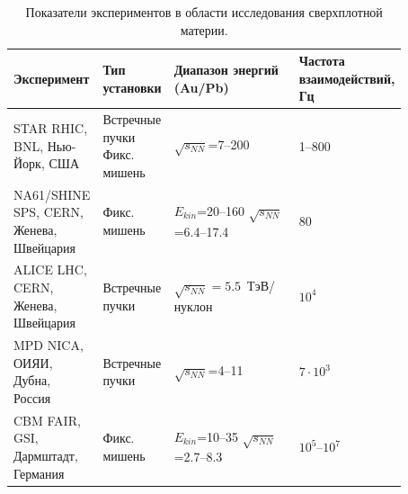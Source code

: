 \begin{table}[H]
\caption{Показатели экспериментов в области исследования сверхплотной материи.}
\label{tabl:Experiments1}
\begin{tabular}{ | p{0.21\linewidth} | p{0.16\linewidth} | p{0.33\linewidth} | p{0.17\linewidth} | }
\hline
Эксперимент & Тип установки & Диапазон энергий (Au/Pb) & Частота взаимодействий, Гц \\
\hline
\scriptsize{STAR \newline RHIC, BNL, \newline Нью-Йорк, США} & \scriptsize{Встречные пучки} \newline \scriptsize{Фикс. мишень}\footnotemark[1] & $\sqrt{s_{NN}}$=7--200 \GeVperNucl{} & 1--800 \\
\hline
\scriptsize{NA61/SHINE \newline SPS, CERN, \newline Женева, Швейцария} & \scriptsize{Фикс. мишень} & $E_{kin}$=20--160 \GeVperNucl{} \newline $\sqrt{s_{NN}}$=6.4--17.4 \GeVperNucl{} & 80 \\
\hline
\scriptsize{ALICE \newline LHC, CERN, \newline Женева, Швейцария} & \scriptsize{Встречные пучки} & $\sqrt{s_{NN}}=5.5$~\mbox{ТэВ/нуклон} & $10^{4}$ \\
\hline
\scriptsize{MPD \newline NICA, ОИЯИ, \newline Дубна, Россия} & \scriptsize{Встречные пучки} & $\sqrt{s_{NN}}$=4--11 \GeVperNucl{} & $7 \cdot 10^{3}$ \\
\hline
\scriptsize{CBM \newline FAIR, GSI, \newline Дармштадт, Германия} & \scriptsize{Фикс. мишень} & $E_{kin}$=10--35 \GeVperNucl{} \newline $\sqrt{s_{NN}}$=2.7--8.3 \GeVperNucl{} & $10^5$--$10^7$ \\
\hline
\end{tabular}
\end{table}



